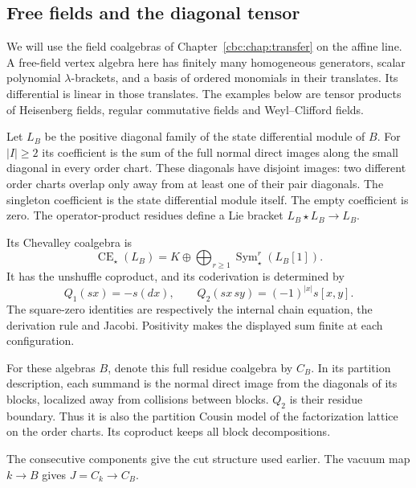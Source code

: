 \subsection{Free fields and the diagonal tensor}

We will use the field coalgebras of
Chapter~\ref{cbc:chap:transfer} on the affine line.
A free-field vertex algebra here has finitely many
homogeneous generators, scalar polynomial
$\lambda$-brackets, and a basis of ordered monomials
in their translates. Its differential is linear in
those translates. The examples below are tensor
products of Heisenberg fields, regular commutative
fields and Weyl--Clifford fields.

Let $L_B$ be the positive diagonal family of the
state differential module of $B$.
For $|I|\geq2$ its coefficient is the sum of the
full normal direct images along the small diagonal
in every order chart. These diagonals have disjoint
images: two different order charts overlap only
away from at least one of their pair diagonals.
The singleton coefficient is the state differential
module itself. The empty coefficient is zero.
The operator-product residues define a Lie bracket
$L_B\star L_B\to L_B$.

Its Chevalley coalgebra is
\[
 \operatorname{CE}_\star(L_B)
   =K\oplus\bigoplus_{r\geq1}
                      \operatorname{Sym}^r_\star(L_B[1]).
\]
It has the unshuffle coproduct, and its
coderivation is determined by
\[
 Q_1(sx)=-s(dx),\qquad
 Q_2(sx\,sy)=(-1)^{|x|}s[x,y].
\]
The square-zero identities are respectively the
internal chain equation, the derivation rule and
Jacobi. Positivity makes the displayed sum finite
at each configuration.

For these algebras $B$, denote this full residue
coalgebra by $C_B$. In its partition description,
each summand is the normal direct image from the
diagonals of its blocks, localized away from
collisions between blocks. $Q_2$ is their residue
boundary. Thus it is also the partition Cousin
model of the factorization lattice on the order
charts. Its coproduct keeps all block decompositions.

The consecutive components give the cut structure
used earlier. The vacuum map $k\to B$ gives
$J=C_k\to C_B$.

